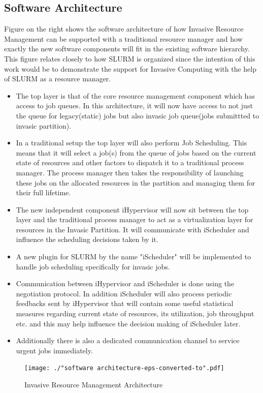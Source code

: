 \documentclass{acm_proc_article-sp}
\begin{document}
\subsection{Software Architecture}
Figure on the right shows the software architecture of how Invasive Resource Management can be supported with a traditional resource manager and how exactly the new software components will fit in the existing software hierarchy. This figure relates closely to how SLURM is organized since the intention of this work would be to demonstrate the support for Invasive Computing with the help of SLURM as a resource manager.
\begin{itemize}
\item The top layer is that of the core resource management component which has access to job queues. In this architecture, it will now have access to not just the queue for legacy(static) jobs but also invasic job queue(jobs submittted to invasic partition).
\item In a traditional setup the top layer will also perform Job Scheduling. This means that it will select a job(s) from the queue of jobs based on the current state of resources and other factors to dispatch it to a traditional process manager. The process manager then takes the responsibility of launching these jobs on the allocated resources in the partition and managing them for their full lifetime. 
\item The new independent component iHypervisor will now sit between the top layer and the traditional process manager to act as a virtualization layer for resources in the Invasic Partition. It will communicate with iScheduler and influence the scheduling decisions taken by it. 
\item A new plugin for SLURM by the name "iScheduler" will be implemented to handle job scheduling specifically for invasic jobs.
\item Communication between iHypervisor and iScheduler is done using the negotiation protocol. In addition iScheduler will also process periodic feedbacks sent by iHypervisor that will contain some useful statistical measures regarding current state of resources, its utilization, job throughput etc. and this may help influence the decision making of iScheduler later. 
\item Additionally there is also a dedicated communication channel to service urgent jobs immediately.
\end{itemize}
\begin{figure}[t]
\centering
\texttt{[image: ./"software architecture-eps-converted-to".pdf]}
\caption{Invasive Resource Management Architecture}
\label{fig:3}
\end{figure}
\end{document}
